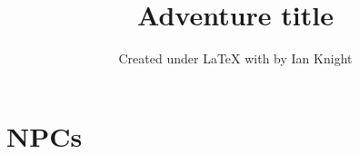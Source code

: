 \documentclass{wfrp-long}
\title{Adventure title}
\date{Created under \LaTeX{} with \WFRPTeX{} by Ian Knight}
\begin{document}
\maketitle

\tableofcontents



\chapter{NPCs}

\end{document}
